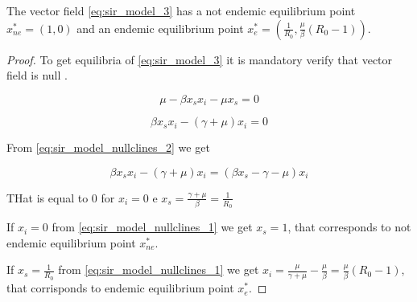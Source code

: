 \begin{theorem}
\label{th:sir_equilibria}
The vector field \ref{eq:sir_model_3} has a not endemic equilibrium point $x_{ne}^* = (1,0)$ and an endemic equilibrium point $x_e^*=(\frac{1}{R_0}, \frac{\mu}{\beta} (R_0 - 1))$.
\end{theorem}

\begin{proof}
To get equilibria of \ref{eq:sir_model_3} it is mandatory verify that vector field is null \cite[p. 3]{bib:khalil}.

\begin{equation}
\label{eq:sir_model_nullclines_1}
         \mu - \beta x_sx_i - \mu x_s = 0
\end{equation}

\begin{equation}
\label{eq:sir_model_nullclines_2}
         \beta x_sx_i - (\gamma + \mu)x_i = 0
\end{equation}

From \ref{eq:sir_model_nullclines_2} we get

\begin{equation}
\label{eq:sir_model_nullclines_2_demonstation}
         \beta x_sx_i - (\gamma + \mu)x_i = (\beta x_s -\gamma - \mu)x_i
\end{equation}

THat is equal to 0 for $x_i = 0$ e $x_s = \frac{\gamma + \mu}{\beta}=\frac{1}{R_0}$

If $x_i = 0$ from \ref{eq:sir_model_nullclines_1} we get $x_s = 1$, that corresponds to not endemic equilibrium point $x_{ne}^*$.

If $x_s = \frac{1}{R_0}$ from \ref{eq:sir_model_nullclines_1} we get $x_i=\frac{\mu}{\gamma + \mu} - \frac{\mu}{\beta} = \frac{\mu}{\beta} (R_0 - 1)$, that corrisponds to endemic equilibrium point $x_e^*$.
\end{proof}